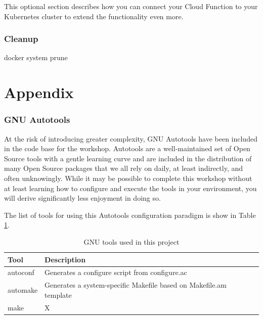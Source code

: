 {\justifying
This optional section describes how you can connect your Cloud Function to your Kubernetes cluster to extend the functionality even more.

\section{\label{sec:cleanup}Cleanup}

\justifying

docker system prune

\clearpage
\part{Appendix}

\appendix

\section{\label{sec:autotools}GNU Autotools}

\justifying
At the risk of introducing greater complexity, GNU Autotools have been included in the code base for the workshop. Autotools
are a well-maintained set of Open Source tools with a gentle learning curve and are included in the distribution of many Open
Source packages that we all rely on daily, at least indirectly, and often unknowingly. While it may be possible to complete this workshop
without at least learning how to configure and execute the tools in your environment, you will derive significantly less enjoyment
in doing so.
\vspace{2mm}

\justifying
The list of tools for using this Autotools configuration paradigm is show in Table \ref{Autotools}.
\vspace{2mm}

\begin{table}[ht]
	\centering
	\begin{tabular}{|l|l|}\hline
		Tool & Description \\\hline
		autoconf & Generates a configure script from configure.ac   \\\hline
		automake & Generates a system-specific Makefile based on Makefile.am template    \\\hline
		make  &   X    \\\hline
	\end{tabular}
	\caption{GNU tools used in this project}
	\label{Autotools}
\end{table}
\vspace{2mm}

}
